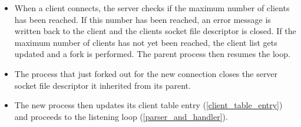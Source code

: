 \documentclass[12pt,english,a4paper]{report}
\begin{document}
\begin{itemize}
  \item When a client connects, the server checks if the maximum number of clients has been reached. If this number has been reached, an error message is written back to the client and the clients socket file descriptor is closed. If the maximum number of clients has not yet been reached, the client list gets updated and a fork is performed.
  The parent process then resumes the loop. 
  \item The process that just forked out for the new connection closes the server socket file descriptor it inherited from its parent. 
  \item The new process then updates its client table entry (\ref{client_table_entry}) and proceeds to the listening loop (\ref{parser_and_handler}).
\end{itemize}
\end{document}
